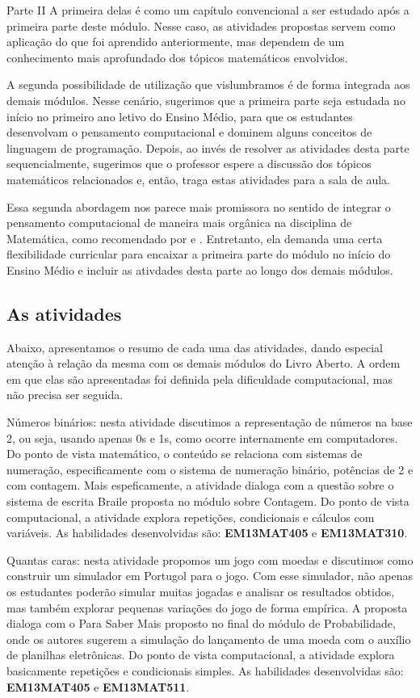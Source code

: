 \begin{paginatexto}{Parte II}
A primeira delas é como um capítulo convencional a ser estudado após a primeira parte deste módulo. Nesse caso, as atividades propostas servem como aplicação do que foi aprendido anteriormente, mas dependem de um conhecimento mais aprofundado dos tópicos matemáticos envolvidos.

A segunda possibilidade de utilização que vislumbramos é de forma integrada aos demais módulos. Nesse cenário, sugerimos que a primeira parte seja estudada no início no primeiro ano letivo do Ensino Médio, para que os estudantes desenvolvam o pensamento computacional e dominem alguns conceitos de linguagem de programação. Depois, ao invés de resolver as atividades desta parte sequencialmente, sugerimos que o professor espere a discussão dos tópicos matemáticos relacionados e, então, traga estas atividades para a sala de aula.

Essa segunda abordagem nos parece mais promissora no sentido de integrar o pensamento computacional de maneira mais orgânica na disciplina de Matemática, como recomendado por \citet{disessa2018} e \citet{li2020}. Entretanto, ela demanda uma certa flexibilidade curricular para encaixar a primeira parte do módulo no início do Ensino Médio e incluir as ativdades desta parte ao longo dos demais módulos.

\subsection{As atividades}
Abaixo, apresentamos o resumo de cada uma das atividades, dando especial atenção à relação da mesma com os demais módulos do Livro Aberto. A ordem em que elas são apresentadas foi definida pela dificuldade computacional, mas não precisa ser seguida.

Números binários: nesta atividade discutimos a representação de números na base 2, ou seja, usando apenas 0s e 1s, como ocorre internamente em computadores. Do ponto de vista matemático, o conteúdo se relaciona com sistemas de numeração, especificamente com o sistema de numeração binário, potências de 2 e com contagem. Mais espeficamente, a atividade dialoga com a questão sobre o sistema de escrita Braile proposta no módulo sobre Contagem. Do ponto de vista computacional, a atividade explora repetições, condicionais e cálculos com variáveis. As habilidades desenvolvidas são: \textbf{EM13MAT405} e \textbf{EM13MAT310}.

Quantas caras: nesta atividade propomos um jogo com moedas e discutimos como construir um simulador em Portugol para o jogo. Com esse simulador, não apenas os estudantes poderão simular muitas jogadas e analisar os resultados obtidos, mas também explorar pequenas variações do jogo de forma empírica. A proposta dialoga com o Para Saber Mais proposto no final do módulo de Probabilidade, onde os autores sugerem a simulação do lançamento de uma moeda com o auxílio de planilhas eletrônicas. Do ponto de vista computacional, a atividade explora basicamente repetições e condicionais simples. As habilidades desenvolvidas são: \textbf{EM13MAT405} e \textbf{EM13MAT511}.


\end{paginatexto}
